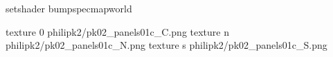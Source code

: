 setshader bumpspecmapworld

texture 0 philipk2/pk02_panels01c_C.png
texture n philipk2/pk02_panels01c_N.png
texture s philipk2/pk02_panels01c_S.png

